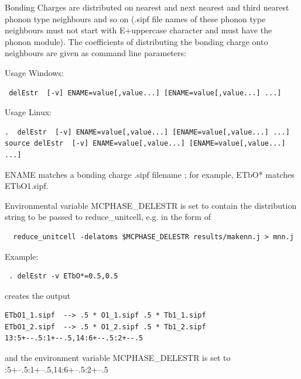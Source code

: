 \begin{description}
Bonding Charges are distributed on nearest and next nearest and third nearest
phonon type neighbours and so on (.sipf file names of these phonon type neighbours 
must not start with E+uppercase character and must have the phonon module).
 The coefficients of distributing the bonding charge onto neighbours
are given as command line parameters:

Usage Windows:
\begin{verbatim}
 delEstr  [-v] ENAME=value[,value...] [ENAME=value[,value...] ...]
\end{verbatim}

Usage Linux:
\begin{verbatim}
.  delEstr  [-v] ENAME=value[,value...] [ENAME=value[,value...] ...]
source delEstr  [-v] ENAME=value[,value...] [ENAME=value[,value...] ...]
\end{verbatim}

ENAME matches a  bonding charge .sipf filename ; for example, ETbO* matches ETbO1.sipf.

Environmental variable {\prg MCPHASE\_DELESTR} is set to contain the distribution string to be
passed to {\prg reduce\_unitcell}, e.g. in the form of
\begin{verbatim}
  reduce_unitcell -delatoms $MCPHASE_DELESTR results/makenn.j > mnn.j
\end{verbatim}

Example:
\begin{verbatim}
 . delEstr -v ETbO*=0.5,0.5
\end{verbatim}

creates the output

\begin{verbatim}
ETbO1_1.sipf  --> .5 * O1_1.sipf .5 * Tb1_1.sipf
ETbO1_2.sipf  --> .5 * O1_2.sipf .5 * Tb1_2.sipf
13:5+--.5:1+--.5,14:6+--.5:2+--.5
\end{verbatim}

and the environment variable 
{\prg MCPHASE\_DELESTR} is set to {:5+--.5:1+--.5,14:6+--.5:2+--.5}


\end{description}
